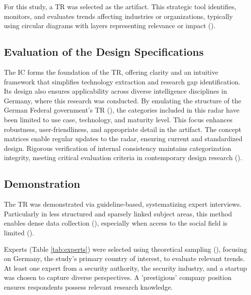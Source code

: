 \documentclass[10pt]{article}
\begin{document}
For this study, a TR was selected as the artifact. This strategic tool identifies, monitors, and evaluates trends affecting industries or organizations, typically using circular diagrams with layers representing relevance or impact (\cite{wulfmettbrenn2017}).

\subsection{Evaluation of the Design Specifications}
The IC forms the foundation of the TR, offering clarity and an intuitive framework that simplifies technology extraction and research gap identification. Its design also ensures applicability across diverse intelligence disciplines in Germany, where this research was conducted. By emulating the structure of the German Federal government's TR (\cite{Stich.2022}), the categories included in this radar have been limited to use case, technology, and maturity level. This focus enhances robustness, user-friendliness, and appropriate detail in the artifact. The concept matrices enable regular updates to the radar, ensuring current and standardized design. Rigorous verification of internal consistency maintains categorization integrity, meeting critical evaluation criteria in contemporary design research (\cite{vomBrocke.2020b}).


\subsection{Demonstration}
The TR was demonstrated via guideline-based, systematizing expert interviews. Particularly in less structured and sparsely linked subject areas, this method enables dense data collection (\cite{Meuser.1991}), especially when access to the social field is limited (\cite{Glaser.2009}).

Experts (Table \ref{tab:experts}) were selected using theoretical sampling (\cite{Glaser.1967}), focusing on Germany, the study's primary country of interest, to evaluate relevant trends. At least one expert from a security authority, the security industry, and a startup was chosen to capture diverse perspectives. A 'prestigious' company position ensures respondents possess relevant research knowledge.
\end{document}
